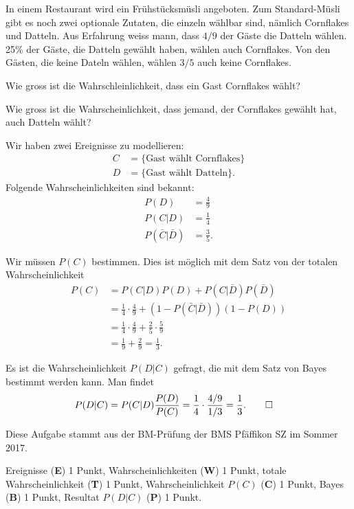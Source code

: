 In einem Restaurant wird ein Frühstücksmüsli angeboten.
Zum Standard-Müsli gibt es noch zwei optionale Zutaten, die einzeln
wählbar sind, nämlich Cornflakes und Datteln.
Aus Erfahrung weiss mann, dass $4/9$ der Gäste die
Datteln wählen.
25\% der Gäste, die Datteln gewählt haben, wählen auch Cornflakes.
Von den Gästen, die keine Dateln wählen, wählen $3/5$ auch keine Cornflakes.

\begin{teilaufgaben}
\item Wie gross ist die Wahrschleinlichkeit, dass ein Gast Cornflakes wählt?
\item Wie gross ist die Wahrscheinlichkeit, dass jemand, der Cornflakes
gewählt hat, auch Datteln wählt?
\end{teilaufgaben}

\begin{loesung}
Wir haben zwei Ereignisse zu modellieren:
\begin{align*}
C
&=
\{\text{Gast wählt Cornflakes}\}
\\
D
&=
\{\text{Gast wählt Datteln}\}.
\end{align*}
Folgende Wahrscheinlichkeiten sind bekannt:
\begin{align*}
P(D)
&=
\frac49
\\
P(C|D)
&=
\frac14
\\
P(\bar C|\bar D)
&=
\frac35.
\end{align*}
\begin{teilaufgaben}
\item Wir müssen $P(C)$ bestimmen.
Dies ist möglich mit dem Satz von der totalen Wahrscheinlichkeit
\begin{align*}
P(C)
&=
P(C|D)P(D) + P(C|\bar D)P(\bar D)
\\
&=
\frac14\cdot \frac49 + (1-P(\bar C|\bar D))(1-P(D))
\\
&=
\frac14\cdot \frac49 + \frac25 \cdot\frac59
\\
&=
\frac19 +\frac29=\frac13.
\end{align*}
\item
Es ist die Wahrscheinlichkeit $P(D|C)$ gefragt, die mit dem Satz von Bayes
bestimmt werden kann.
Man findet
\begin{align*}
P(D|C)
&=
P(C|D)\frac{P(D)}{P(C)}
=
\frac14\cdot\frac{4/9}{1/3}=\frac13.
\qedhere
\end{align*}
\end{teilaufgaben}
\end{loesung}

\begin{diskussion}
Diese Aufgabe stammt aus der BM-Prüfung der BMS Pfäffikon SZ im Sommer 2017.
\end{diskussion}

\begin{bewertung}
Ereignisse ({\bf E}) 1 Punkt,
Wahrscheinlichkeiten ({\bf W}) 1 Punkt,
totale Wahrscheinlichkeit ({\bf T}) 1 Punkt,
Wahrscheinlichkeit $P(C)$ ({\bf C}) 1 Punkt,
Bayes ({\bf B}) 1 Punkt,
Resultat $P(D|C)$ ({\bf P}) 1 Punkt.
\end{bewertung}

